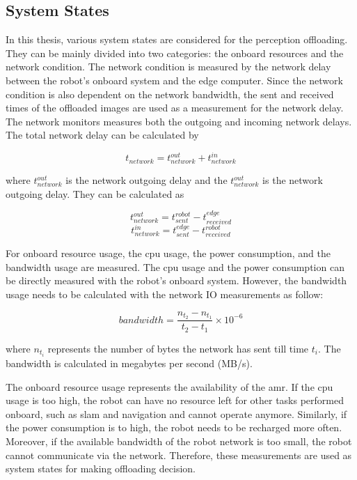 \subsection{System States}

In this thesis, various system states are considered for the perception offloading. They can be mainly divided into two categories: the onboard resources and the network condition. The network condition is measured by the network delay between the robot's onboard system and the edge computer. Since the network condition is also dependent on the network bandwidth, the sent and received times of the offloaded images are used as a measurement for the network delay. The network monitors measures both the outgoing and incoming network delays. The total network delay can be calculated by

\begin{equation}
    t_{network} = t_{network}^{out} + t_{network}^{in}
\end{equation}

where $t_{network}^{out}$ is the network outgoing delay and the $t_{network}^{out}$ is the network outgoing delay. They can be calculated as

\begin{equation*}
    t_{network}^{out} = t_{sent}^{robot} - t_{received}^{edge}
\end{equation*}
\begin{equation*}
    t_{network}^{in} = t_{sent}^{edge} - t_{received}^{robot}
\end{equation*}

For onboard resource usage, the \gls{cpu} usage, the power consumption, and the bandwidth usage are measured. The \gls{cpu} usage and the power consumption can be directly measured with the robot's onboard system. However, the bandwidth usage needs to be calculated with the network IO measurements as follow:

\begin{equation}
    bandwidth = \frac{n_{t_2} - n_{t_1}}{t_2 - t_1} \times 10^{-6} 
\end{equation}

where $n_{t_i}$ represents the number of bytes the network has sent till time $t_i$. The bandwidth is calculated in megabytes per second (MB/s). 

The onboard resource usage represents the availability of the \gls{amr}. If the \gls{cpu} usage is too high, the robot can have no resource left for other tasks performed onboard, such as \gls{slam} and navigation and cannot operate anymore. Similarly, if the power consumption is to high, the robot needs to be recharged more often. Moreover, if the available bandwidth of the robot network is too small, the robot cannot communicate via the network. Therefore, these measurements are used as system states for making offloading decision. 

